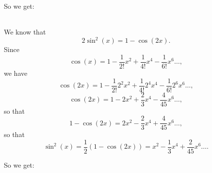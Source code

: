 \documentclass[pdftex,11pt]{article}
\begin{document}
\begin{enumerate}
So we get:
\begin{center}
\end{center}

\\

We know that 
$$  2\sin^2(x) = 1 - \cos(2x).$$
Since 
$$\cos(x) = 1 - \frac1{2!} x^2 + \frac1{4!}  x^4 - \frac1{6!} x^6 \ldots,$$
we have
$$\cos(2x) = 1 - \frac1{2!} 2^2 x^2 + \frac1{4!} 2^4 x^4 - \frac1{6!} 2^6x^6 \ldots,$$
$$\cos(2x) = 1 - 2 x^2 + \frac2{3} x^4 - \frac4{45} x^6 \ldots,$$
so that
$$1-\cos(2x) = 2 x^2 - \frac2{3} x^4 + \frac4{45} x^6 \ldots,$$
so that
$$  \sin^2(x) =\frac{1}{2}( 1 - \cos(2x)) = x^2 - \frac1{3} x^4 + \frac2{45} x^6 \ldots.$$


So we get:
\begin{center}
\end{center}

















\end{enumerate}
\end{document}
